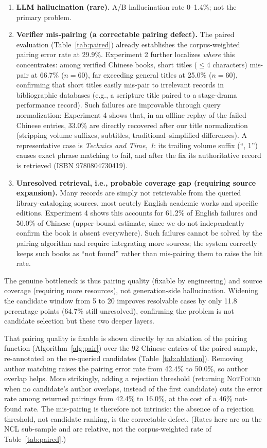 \documentclass[conference]{IEEEtran}
\begin{document}
\begin{enumerate}
\item \textbf{LLM hallucination (rare).} A/B hallucination rate 0--1.4\%; not
the primary problem.
\item \textbf{Verifier mis-pairing (a correctable pairing defect).} The paired
evaluation (Table~\ref{tab:paired}) already establishes the corpus-weighted
pairing error rate at 29.9\%. Experiment 2 further localizes \emph{where} this
concentrates: among verified Chinese books, short titles ($\leq 4$ characters)
mis-pair at 66.7\% ($n=60$), far exceeding general titles at 25.0\% ($n=60$),
confirming that short titles easily mis-pair to irrelevant records in
bibliographic databases (e.g., a scripture title paired to a stage-drama
performance record). Such failures are improvable through query normalization:
Experiment 4 shows that, in an offline replay of the failed Chinese entries,
33.0\% are directly recovered after our title normalization (stripping volume
suffixes, subtitles, traditional--simplified differences). A representative case
is \textit{Technics and Time, 1}: its trailing volume suffix (``, 1'') causes
exact phrase matching to fail, and after the fix its authoritative record is
retrieved (ISBN 9780804730419).
\item \textbf{Unresolved retrieval, i.e., probable coverage gap (requiring
source expansion).} Many records are simply not retrievable from the queried
library-cataloging sources, most acutely English academic works and specific
editions. Experiment 4 shows this accounts for 61.2\% of English failures and
50.0\% of Chinese (upper-bound estimate, since we do not independently confirm
the book is absent everywhere). Such failures cannot be solved by the pairing algorithm
and require integrating more sources; the system correctly keeps such books as
``not found'' rather than mis-pairing them to raise the hit rate.
\end{enumerate}

The genuine bottleneck is thus pairing quality (fixable by engineering) and
source coverage (requiring more resources), not generation-side hallucination.
Widening the candidate window from 5 to 20 improves resolvable cases by only 11.8
percentage points (64.7\% still unresolved), confirming the problem is not
candidate selection but these two deeper layers.

That pairing quality is fixable is shown directly by an ablation of the pairing
function (Algorithm~\ref{alg:pair}) over the 92 Chinese entries of the paired
sample, re-annotated on the re-queried candidates (Table~\ref{tab:ablation}).
Removing author matching raises the pairing error rate from 42.4\% to 50.0\%, so
author overlap helps. More strikingly, adding a rejection threshold (returning
\textsc{NotFound} when no candidate's author overlaps, instead of the first
candidate) cuts the error rate among returned pairings from 42.4\% to 16.0\%, at
the cost of a 46\% not-found rate. The mis-pairing is therefore not intrinsic:
the absence of a rejection threshold, not candidate ranking, is the correctable
defect. (Rates here are on the NCL sub-sample and are relative, not the
corpus-weighted rate of Table~\ref{tab:paired}.)
\end{document}
